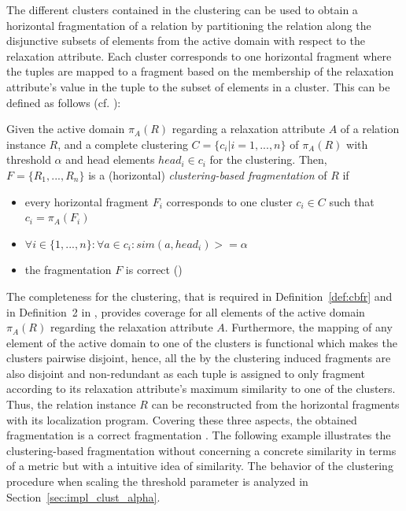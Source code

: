 The different clusters contained in the clustering can be used to obtain a horizontal fragmentation of a relation by partitioning the relation along the 
disjunctive subsets of elements from the active domain with respect to the relaxation attribute. Each cluster corresponds to one horizontal fragment where
the tuples are mapped to a fragment based on the membership of the relaxation attribute's value in the tuple to the subset of elements in a cluster. This 
can be defined as follows (cf. \cite[Definition~2]{Wiese2014}):

\begin{definition} \label{def:cbfr}
Given the active domain $\pi_A(R)$ regarding a relaxation attribute $A$ of a relation instance $R$, and a complete clustering $C=\{c_i|i=1,...,n\}$
of $\pi_A(R)$ with threshold $\alpha$ and head elements $head_i \in c_i$ for the clustering. Then, $F=\{R_1,...,R_n\}$ is a (horizontal) 
\emph{clustering-based fragmentation} of $R$ if
\begin{itemize}
    \item every horizontal fragment $F_i$ corresponds to one cluster $c_i \in C$ such that $c_i=\pi_A(F_i)$
    \item $\forall i \in \{1,...,n\}: \forall a \in c_i: sim(a, head_i)>=\alpha$
    \item the fragmentation $F$ is correct (\cite[p.~103]{Ozsu1991})
\end{itemize}
\end{definition}

The completeness for the clustering, that is required in Definition~\ref{def:cbfr} and in Definition~2 in \cite{Wiese2014},
provides coverage for all elements of the active domain $\pi_A(R)$ regarding the relaxation attribute $A$. Furthermore, the mapping of any element of the
active domain to one of the clusters is functional which makes the clusters pairwise disjoint, hence, all the by the clustering induced fragments are also
disjoint and non-redundant as each tuple is assigned to only fragment according to its relaxation attribute's maximum similarity to one of the clusters.
Thus, the relation instance $R$ can be reconstructed from the horizontal fragments with its localization program. Covering these three aspects, the
obtained fragmentation is a correct fragmentation \cite[p.~103]{Ozsu1991}. The following example illustrates the clustering-based fragmentation without
concerning a concrete similarity in terms of a metric but with a intuitive idea of similarity. The behavior of the clustering procedure when scaling the
threshold parameter is analyzed in Section~\ref{sec:impl_clust_alpha}.

